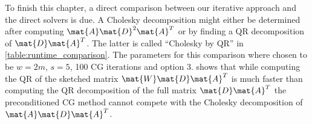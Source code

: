 To finish this chapter, a direct comparison between our iterative approach and the direct solvers is due.
A Cholesky decomposition might either be determined after computing \(\mat{A}\mat{D}^2\mat{A}^T\) or by finding a QR decomposition of \(\mat{D}\mat{A}^T\).
The latter is called \enquote{Cholesky by QR} in \cref{table:runtime_comparison}.
The parameters for this comparison where chosen to be \(w=2m\), \(s=5\), 100 CG iterations and option 3.
 shows that while computing the QR of the sketched matrix \(\mat{W}\mat{D}\mat{A}^T\) is much faster than computing the QR decomposition of the full matrix \(\mat{D}\mat{A}^T\) the preconditioned CG method cannot compete with the Cholesky decomposition of \(\mat{A}\mat{D}\mat{A}^T\).

